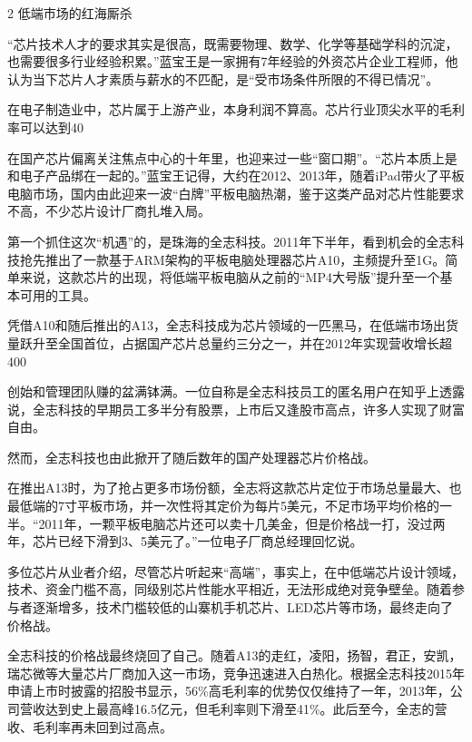 \documentclass[utf8]{book}
\begin{document}
	\begin{flushleft}
		{\Large 2 低端市场的红海厮杀}
	\end{flushleft}
	
	
	
	“芯片技术人才的要求其实是很高，既需要物理、数学、化学等基础学科的沉淀，也需要很多行业经验积累。”蓝宝王是一家拥有7年经验的外资芯片企业工程师，他认为当下芯片人才素质与薪水的不匹配，是“受市场条件所限的不得已情况”。
	
	在电子制造业中，芯片属于上游产业，本身利润不算高。芯片行业顶尖水平的毛利率可以达到40%
	
	在国产芯片偏离关注焦点中心的十年里，也迎来过一些“窗口期”。“芯片本质上是和电子产品绑在一起的。”蓝宝王记得，大约在2012、2013年，随着iPad带火了平板电脑市场，国内由此迎来一波“白牌”平板电脑热潮，鉴于这类产品对芯片性能要求不高，不少芯片设计厂商扎堆入局。
	
	第一个抓住这次“机遇”的，是珠海的全志科技。2011年下半年，看到机会的全志科技抢先推出了一款基于ARM架构的平板电脑处理器芯片A10，主频提升至1G。简单来说，这款芯片的出现，将低端平板电脑从之前的“MP4大号版”提升至一个基本可用的工具。
	
	凭借A10和随后推出的A13，全志科技成为芯片领域的一匹黑马，在低端市场出货量跃升至全国首位，占据国产芯片总量约三分之一，并在2012年实现营收增长超400%
	
	创始和管理团队赚的盆满钵满。一位自称是全志科技员工的匿名用户在知乎上透露说，全志科技的早期员工多半分有股票，上市后又逢股市高点，许多人实现了财富自由。
	
	然而，全志科技也由此掀开了随后数年的国产处理器芯片价格战。
	
	在推出A13时，为了抢占更多市场份额，全志将这款芯片定位于市场总量最大、也最低端的7寸平板市场，并一次性将其定价为每片5美元，不足市场平均价格的一半。“2011年，一颗平板电脑芯片还可以卖十几美金，但是价格战一打，没过两年，芯片已经下滑到3、5美元了。”一位电子厂商总经理回忆说。
	
	多位芯片从业者介绍，尽管芯片听起来“高端”，事实上，在中低端芯片设计领域，技术、资金门槛不高，同级别芯片性能水平相近，无法形成绝对竞争壁垒。随着参与者逐渐增多，技术门槛较低的山寨机手机芯片、LED芯片等市场，最终走向了价格战。
	
	全志科技的价格战最终烧回了自己。随着A13的走红，凌阳，扬智，君正，安凯，瑞芯微等大量芯片厂商加入这一市场，竞争迅速进入白热化。根据全志科技2015年申请上市时披露的招股书显示，56\%高毛利率的优势仅仅维持了一年，2013年，公司营收达到史上最高峰16.5亿元，但毛利率则下滑至41\%。此后至今，全志的营收、毛利率再未回到过高点。
	
\end{document}
